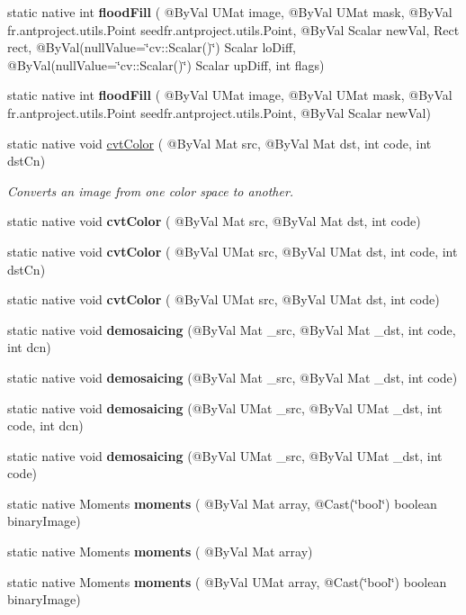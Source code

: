 \begin{DoxyCompactItemize}
\item 
static native int {\bfseries flood\+Fill} ( @By\+Val U\+Mat image, @By\+Val U\+Mat mask, @By\+Val fr.antproject.utils.Point seed\+fr.antproject.utils.Point, @By\+Val Scalar new\+Val, Rect rect, @By\+Val(null\+Value=\char`\"{}cv\+::\+Scalar()\char`\"{}) Scalar lo\+Diff, @By\+Val(null\+Value=\char`\"{}cv\+::\+Scalar()\char`\"{}) Scalar up\+Diff, int flags)
\item 
static native int {\bfseries flood\+Fill} ( @By\+Val U\+Mat image, @By\+Val U\+Mat mask, @By\+Val fr.antproject.utils.Point seed\+fr.antproject.utils.Point, @By\+Val Scalar new\+Val)
\item 
static native void \hyperlink{group__imgproc__misc_gaab99985581c43cce9df680e6586cb9ef}{cvt\+Color} ( @By\+Val Mat src, @By\+Val Mat dst, int code, int dst\+Cn)
\begin{DoxyCompactList}\small\item\em Converts an image from one color space to another. \end{DoxyCompactList}\item 
static native void {\bfseries cvt\+Color} ( @By\+Val Mat src, @By\+Val Mat dst, int code)
\item 
static native void {\bfseries cvt\+Color} ( @By\+Val U\+Mat src, @By\+Val U\+Mat dst, int code, int dst\+Cn)
\item 
static native void {\bfseries cvt\+Color} ( @By\+Val U\+Mat src, @By\+Val U\+Mat dst, int code)
\item 
static native void {\bfseries demosaicing} (@By\+Val Mat \+\_\+src, @By\+Val Mat \+\_\+dst, int code, int dcn)
\item 
static native void {\bfseries demosaicing} (@By\+Val Mat \+\_\+src, @By\+Val Mat \+\_\+dst, int code)
\item 
static native void {\bfseries demosaicing} (@By\+Val U\+Mat \+\_\+src, @By\+Val U\+Mat \+\_\+dst, int code, int dcn)
\item 
static native void {\bfseries demosaicing} (@By\+Val U\+Mat \+\_\+src, @By\+Val U\+Mat \+\_\+dst, int code)
\item 
static native Moments {\bfseries moments} ( @By\+Val Mat array, @Cast(\char`\"{}bool\char`\"{}) boolean binary\+Image)
\item 
static native Moments {\bfseries moments} ( @By\+Val Mat array)
\item 
static native Moments {\bfseries moments} ( @By\+Val U\+Mat array, @Cast(\char`\"{}bool\char`\"{}) boolean binary\+Image)
\item 

\end{DoxyCompactItemize}
